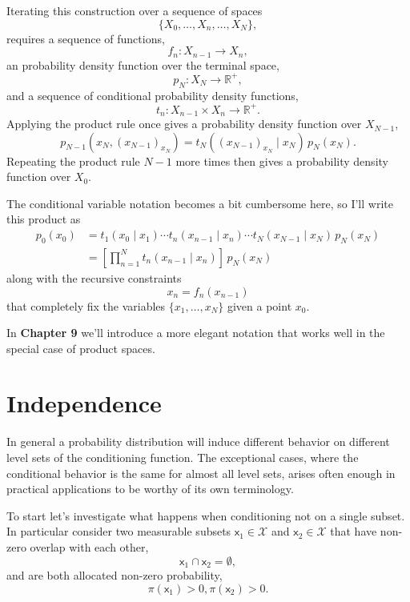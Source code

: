 \documentclass[
  letterpaper,
  DIV=11,
  numbers=noendperiod]{scrartcl}
\begin{document}
Iterating this construction over a sequence of spaces \[
\{ X_{0}, \ldots, X_{n}, \ldots, X_{N} \},
\] requires a sequence of functions, \[
f_{n} : X_{n - 1} \rightarrow X_{n},
\] an probability density function over the terminal space, \[
p_{N} : X_{N} \rightarrow \mathbb{R}^{+},
\] and a sequence of conditional probability density functions, \[
t_{n} : X_{n - 1} \times X_{n} \rightarrow \mathbb{R}^{+}.
\] Applying the product rule once gives a probability density function
over \(X_{N - 1}\), \[
p_{N - 1}(x_{N}, ( x_{N - 1})_{x_{N}} ) =
t_{N}( (x_{N - 1})_{x_{N}} \mid x_{N} ) \,
p_{N} (x_{N} ).
\] Repeating the product rule \(N - 1\) more times then gives a
probability density function over \(X_{0}\).

The conditional variable notation becomes a bit cumbersome here, so I'll
write this product as \begin{align*}
p_{0}(x_{0})
&=
t_{1}( x_{0} \mid x_{1} ) \cdots
t_{n}( x_{n - 1} \mid x_{n} ) \cdots
t_{N}( x_{N - 1} \mid x_{N} ) \, p_{N} (x_{N})
\\
&=
\left[ \prod_{n = 1}^{N} t_{n}( x_{n - 1} \mid x_{n} ) \right] \,
p_{N} (x_{N})
\end{align*} along with the recursive constraints \[
x_{n} = f_{n}( x_{n - 1} )
\] that completely fix the variables \(\{ x_{1}, \ldots, x_{N} \}\)
given a point \(x_{0}\).

In \textbf{Chapter 9} we'll introduce a more elegant notation that works
well in the special case of product spaces.

\section{Independence}\label{independence}

In general a probability distribution will induce different behavior on
different level sets of the conditioning function. The exceptional
cases, where the conditional behavior is the same for almost all level
sets, arises often enough in practical applications to be worthy of its
own terminology.

To start let's investigate what happens when conditioning not on a
single subset. In particular consider two measurable subsets
\(\mathsf{x}_{1} \in \mathcal{X}\) and
\(\mathsf{x}_{2} \in \mathcal{X}\) that have non-zero overlap with each
other, \[
\mathsf{x}_{1} \cap \mathsf{x}_{2} = \emptyset,
\] and are both allocated non-zero probability, \[
\pi(\mathsf{x}_{1}) > 0, \pi(\mathsf{x}_{2}) > 0.
\]
\end{document}
